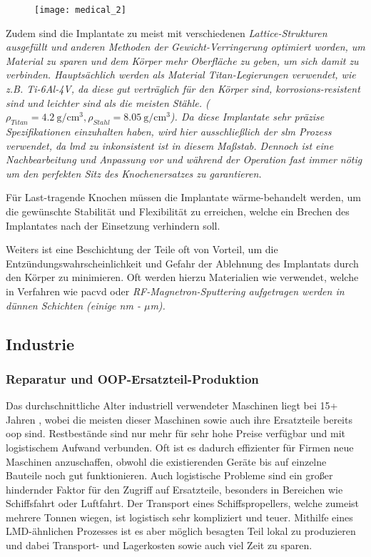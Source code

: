 \documentclass[../main.tex]{subfiles}
\begin{document}
\begin{figure}[H]
	\centering
	\texttt{[image: medical\_2]}
	\label{img:medical}
\end{figure} 
Zudem sind die Implantate zu meist mit verschiedenen \it{Lattice}-Strukturen ausgefüllt und anderen Methoden der Gewicht-Verringerung optimiert worden, um Material zu sparen und dem Körper mehr Oberfläche zu geben, um sich damit zu verbinden. Hauptsächlich werden als Material Titan-Legierungen verwendet, wie z.B. Ti-6Al-4V, da diese gut verträglich für den Körper sind, korrosions-resistent sind und leichter sind als die meisten Stähle.
($\rho_{Titan} = \qty{4.2}{\gram\per\centi\meter\cubed}, \rho_{Stahl} = \qty{8.05}{\gram\per\cm\cubed}$). \parencite{steel12709, titanium6al4v}
Da diese Implantate sehr präzise Spezifikationen einzuhalten haben, wird hier ausschließlich der \acrlong{slm} Prozess verwendet, da \acrshort{lmd} zu inkonsistent ist in diesem Maßstab. Dennoch ist eine Nachbearbeitung und Anpassung vor und während der Operation fast immer nötig um den perfekten Sitz des Knochenersatzes zu garantieren.\parencite{doi:10.1146/annurev-bioeng-082020-032402}

Für Last-tragende Knochen müssen die Implantate wärme-behandelt werden, um die gewünschte Stabilität und Flexibilität zu erreichen, welche ein Brechen des Implantates nach der Einsetzung verhindern soll.

Weiters ist eine Beschichtung der Teile oft von Vorteil, um die Entzündungswahrscheinlichkeit und Gefahr der Ablehnung des Implantats durch den Körper zu minimieren. Oft werden hierzu Materialien wie  verwendet, welche in Verfahren wie \acrfull{pacvd} oder \it{RF-Magnetron-Sputtering} aufgetragen werden in dünnen Schichten (einige nm - $\mu$m).\parencite{Chudinova2016}

 
\subsection{Industrie}
\subsubsection{Reparatur und OOP-Ersatzteil-Produktion}
Das durchschnittliche Alter industriell verwendeter Maschinen liegt bei 15+ Jahren \parencite{lifespan_1}, wobei die meisten dieser Maschinen sowie auch ihre Ersatzteile bereits \acrfull{oop} sind. 
Restbestände sind nur mehr für sehr hohe Preise verfügbar und mit logistischem Aufwand verbunden. 
Oft ist es dadurch effizienter für Firmen neue Maschinen anzuschaffen, obwohl die existierenden Geräte bis auf einzelne Bauteile noch gut funktionieren. 
Auch logistische Probleme sind ein großer hindernder Faktor für den Zugriff auf Ersatzteile, besonders in Bereichen wie Schiffsfahrt oder Luftfahrt. Der Transport eines Schiffspropellers, welche zumeist mehrere Tonnen wiegen, ist logistisch sehr kompliziert und teuer.  
Mithilfe eines LMD-ähnlichen Prozesses ist es aber möglich besagten Teil lokal zu produzieren \parencite{ship_1} und dabei Transport- und Lagerkosten sowie auch viel Zeit zu sparen. 
\end{document}
